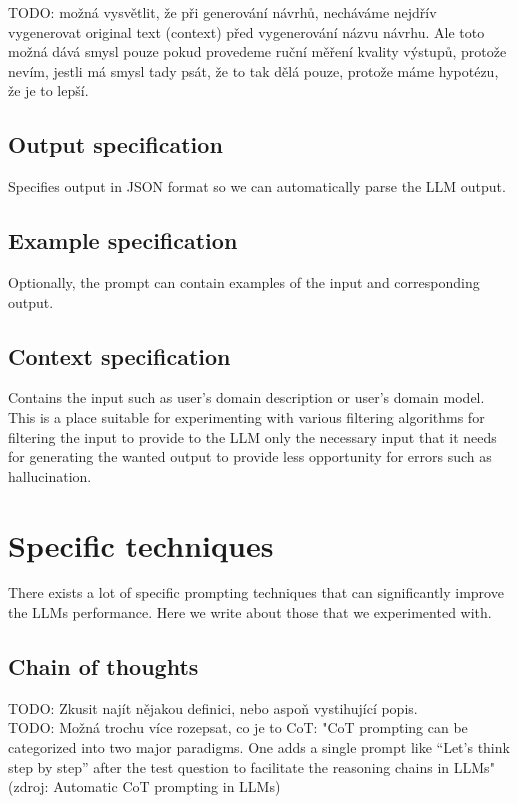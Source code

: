 TODO: možná vysvětlit, že při generování návrhů, necháváme nejdřív vygenerovat original text (context) před vygenerování názvu návrhu. Ale toto možná dává smysl pouze pokud provedeme ruční měření kvality výstupů, protože nevím, jestli má smysl tady psát, že to tak dělá pouze, protože máme hypotézu, že je to lepší.


\subsection{Output specification}
Specifies output in JSON format so we can automatically parse the LLM output.


\subsection{Example specification}
Optionally, the prompt can contain examples of the input and corresponding output.


\subsection{Context specification}
Contains the input such as user's domain description or user's domain model. This is a place suitable for experimenting with various filtering algorithms for filtering the input to provide to the LLM only the necessary input that it needs for generating the wanted output to provide less opportunity for errors such as hallucination.


\section{Specific techniques}

There exists a lot of specific prompting techniques that can significantly improve the LLMs performance. Here we write about those that we experimented with.


\subsection{Chain of thoughts}

TODO: Zkusit najít nějakou definici, nebo aspoň vystihující popis. \\

TODO: Možná trochu více rozepsat, co je to CoT: "CoT prompting can be categorized into two major paradigms. One adds a single prompt like “Let’s think step by step”
 after the test question to facilitate the reasoning chains in LLMs" (zdroj: Automatic CoT prompting in LLMs) \\

